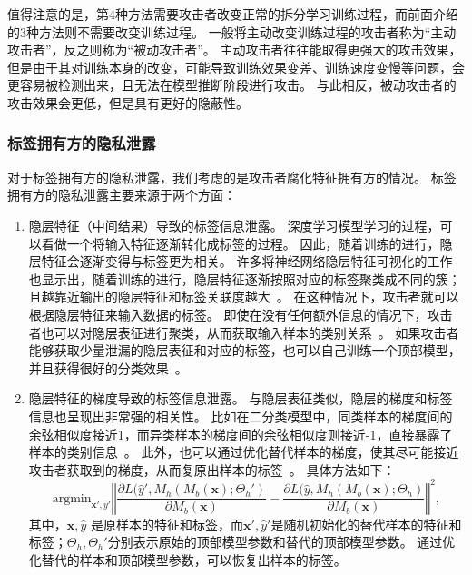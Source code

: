 值得注意的是，第4种方法需要攻击者改变正常的拆分学习训练过程，而前面介绍的3种方法则不需要改变训练过程。
%
一般将主动改变训练过程的攻击者称为“主动攻击者”，反之则称为“被动攻击者”。
%
主动攻击者往往能取得更强大的攻击效果，但是由于其对训练本身的改变，可能导致训练效果变差、训练速度变慢等问题，会更容易被检测出来，且无法在模型推断阶段进行攻击。
与此相反，被动攻击者的攻击效果会更低，但是具有更好的隐蔽性。

\subsubsection{标签拥有方的隐私泄露}
对于标签拥有方的隐私泄露，我们考虑的是攻击者腐化特征拥有方的情况。
%
标签拥有方的隐私泄露主要来源于两个方面：
\begin{enumerate}
    \item 隐层特征（中间结果）导致的标签信息泄露。
    深度学习模型学习的过程，可以看做一个将输入特征逐渐转化成标签的过程。
    因此，随着训练的进行，隐层特征会逐渐变得与标签更为相关。
    许多将神经网络隐层特征可视化的工作也显示出，随着训练的进行，隐层特征逐渐按照对应的标签聚类成不同的簇；且越靠近输出的隐层特征和标签关联度越大~\cite{paulo2017visualize_hidden,pezzotti2017deepeyes,cantareira2020hidden_vector_fields}。
    在这种情况下，攻击者就可以根据隐层特征来输入数据的标签。
    即使在没有任何额外信息的情况下，攻击者也可以对隐层表征进行聚类，从而获取输入样本的类别关系~\cite{liujunlin2022clustering_attack,liujunlin2023distance_attack}。
    如果攻击者能够获取少量泄漏的隐层表征和对应的标签，也可以自己训练一个顶部模型，并且获得很好的分类效果~\cite{fucong2022label_infer_attack}。
    \item 隐层特征的梯度导致的标签信息泄露。
    与隐层表征类似，隐层的梯度和标签信息也呈现出非常强的相关性。
    比如在二分类模型中，同类样本的梯度间的余弦相似度接近1，而异类样本的梯度间的余弦相似度则接近-1，直接暴露了样本的类别信息~\cite{oscarli2022label_defense_marvell}。
    此外，也可以通过优化替代样本的梯度，使其尽可能接近攻击者获取到的梯度，从而复原出样本的标签~\cite{erdogan2022unsplit}。
    具体方法如下：
    \begin{equation}
        \text{argmin}_{\mathbf x', \hat y'} \left\Vert \dfrac{\partial L(\hat y', M_h(M_b(\mathbf x);\Theta_h')}{\partial M_b(\mathbf x)} - \dfrac{\partial L(\hat y, M_h(M_b(\mathbf x);\Theta_h)}{\partial M_b(\mathbf x)} \right\Vert^2,
    \end{equation}
    其中，$\mathbf x, \hat y$ 是原样本的特征和标签，而$\mathbf x', \hat y'$是随机初始化的替代样本的特征和标签；$\Theta_h, \Theta_h'$分别表示原始的顶部模型参数和替代的顶部模型参数。
    通过优化替代的样本和顶部模型参数，可以恢复出样本的标签。
\end{enumerate}


